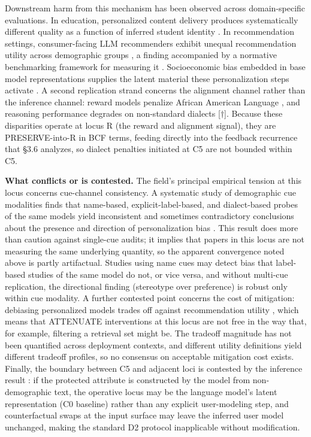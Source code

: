 \documentclass[10pt]{article}
\begin{document}
Downstream harm from this mechanism has been observed across domain-specific evaluations. In education, personalized content delivery produces systematically different quality as a function of inferred student identity \cite{weissburg2024llms}. In recommendation settings, consumer-facing LLM recommenders exhibit unequal recommendation utility across demographic groups \cite{deldjoo2024cfairllm}, a finding accompanied by a normative benchmarking framework for measuring it \cite{deldjoo2024normative}. Socioeconomic bias embedded in base model representations supplies the latent material these personalization steps activate \cite{arzaghi2024understanding}. A second replication strand concerns the alignment channel rather than the inference channel: reward models penalize African American Language \cite{mire2025rejected}, and reasoning performance degrades on non-standard dialects \cite{lin2024assessing}[$\dagger$]. Because these disparities operate at locus R (the reward and alignment signal), they are PRESERVE-into-R in BCF terms, feeding directly into the feedback recurrence that \S{}3.6 analyzes, so dialect penalties initiated at C5 are not bounded within C5.

\textbf{What conflicts or is contested.} The field's principal empirical tension at this locus concerns cue-channel consistency. A systematic study of demographic cue modalities finds that name-based, explicit-label-based, and dialect-based probes of the same models yield inconsistent and sometimes contradictory conclusions about the presence and direction of personalization bias \cite{tonneau2026different}. This result does more than caution against single-cue audits; it implies that papers in this locus are not measuring the same underlying quantity, so the apparent convergence noted above is partly artifactual. Studies using name cues may detect bias that label-based studies of the same model do not, or vice versa, and without multi-cue replication, the directional finding (stereotype over preference) is robust only within cue modality. A further contested point concerns the cost of mitigation: debiasing personalized models trades off against recommendation utility \cite{vijjini2024exploring}, which means that ATTENUATE interventions at this locus are not free in the way that, for example, filtering a retrieval set might be. The tradeoff magnitude has not been quantified across deployment contexts, and different utility definitions yield different tradeoff profiles, so no consensus on acceptable mitigation cost exists. Finally, the boundary between C5 and adjacent loci is contested by the inference result \cite{staab2023memorization}: if the protected attribute is constructed by the model from non-demographic text, the operative locus may be the language model's latent representation (C0 baseline) rather than any explicit user-modeling step, and counterfactual swaps at the input surface may leave the inferred user model unchanged, making the standard D2 protocol inapplicable without modification.
\end{document}
